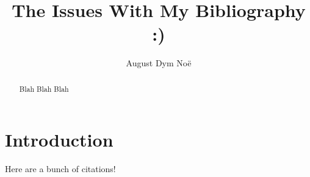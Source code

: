 \documentclass[draft]{amsart}
\title{The Issues With My Bibliography :)}
\author{August Dym Noë}
\begin{document}
\begin{abstract}
Blah Blah Blah
    \tableofcontents
\end{abstract}
\maketitle



\section{Introduction}
    Here are a bunch of citations! 
\cite{ARobinson1973} \cite{Casselman2014TheBT }\cite{Chiswell_2001 }\cite{Goldblatt_1998} \cite{Johnstone_1982} \cite{kramer2004asymptoticconesultrapowerslie} \cite{kruckmannotes} \cite{Lightstone_Robinson_1975} \cite{Tao_2017} \cite{Tarski_2019b}

\printbibliography
\end{document}
